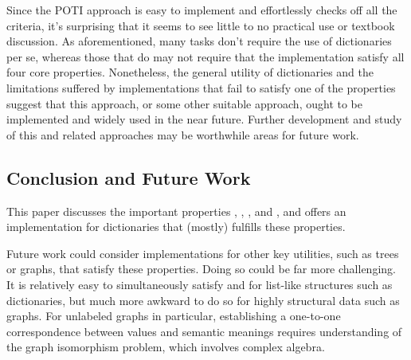 Since the POTI \cal{} approach is easy to implement and effortlessly checks off all the criteria, it's surprising that it seems to see little to no practical use or textbook discussion.
%
As aforementioned, many tasks don't require the use of dictionaries per se, whereas those that do may not require that the implementation satisfy all four core properties.
%
Nonetheless, the general utility of dictionaries and the limitations suffered by implementations that fail to satisfy one of the properties suggest that this approach,
%
or some other suitable approach, ought to be implemented and widely used in the near future.
%
Further development and study of this and related approaches may be worthwhile areas for future work.

\subsection{Conclusion and Future Work}
\label{sec:Discussion:Conclusion}
%
This paper discusses the important properties \SemTot, \SemInj, \EqDec, and \EzDstr, and offers an implementation for dictionaries that (mostly) fulfills these properties.

Future work could consider implementations for other key utilities, such as trees or graphs, that satisfy these properties.
%
Doing so could be far more challenging.
%
It is relatively easy to simultaneously satisfy \SemTot{} and \SemInj{} for list-like structures such as dictionaries,
%
but much more awkward to do so for highly structural data such as graphs. For unlabeled graphs in particular, establishing a one-to-one correspondence between values and
%
semantic meanings requires understanding of the graph isomorphism problem, which involves complex algebra.

